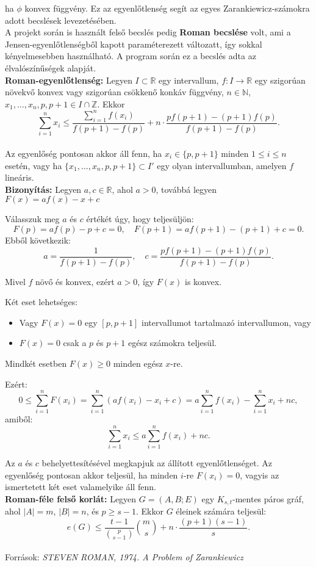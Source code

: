 \documentclass[12pt,a4paper]{article}
\begin{document}
ha $\phi$ konvex függvény. Ez az egyenlőtlenség segít az egyes Zarankiewicz-számokra adott becslések levezetésében.
\\[2mm]
A projekt során is használt felső becslés pedig \textbf{Roman becslése} volt, ami a Jensen-egyenlőtlenségből kapott paraméterezett változatt, így sokkal kényelmesebben használható. A program során ez a becslés adta az élvalószínűségek alapját.
\\[2mm]
\textbf{Roman-egyenlőtlenség:} Legyen $I \subset \mathbb{R}$ egy intervallum, $f : I \to \mathbb{R}$ egy szigorúan növekvő konvex vagy szigorúan csökkenő konkáv függvény, $n \in \mathbb{N}$, $x_1, \dots, x_n, p, p+1 \in I \cap \mathbb{Z}$. Ekkor
\[
\sum_{i=1}^{n} x_i \leq \frac{\sum_{i=1}^{n} f(x_i)}{f(p+1) - f(p)} + n \cdot \frac{p f(p+1) - (p+1) f(p)}{f(p+1) - f(p)}.
\]
\\[2mm]
Az egyenlőség pontosan akkor áll fenn, ha $x_i \in \{p, p+1\}$ minden $1 \leq i \leq n$ esetén, vagy ha $\{x_1, \dots, x_n, p, p+1\} \subset I'$ egy olyan intervallumban, amelyen $f$ lineáris.
\\[2mm]
\textbf{Bizonyítás:} Legyen $a, c \in \mathbb{R}$, ahol $a > 0$, továbbá legyen $F(x) = a f(x) - x + c$

Válasszuk meg $a$ és $c$ értékét úgy, hogy teljesüljön:
\[
F(p) = a f(p) - p + c = 0,\quad F(p+1) = a f(p+1) - (p+1) + c = 0.
\]
Ebből következik:
\[
a = \frac{1}{f(p+1) - f(p)},\quad c = \frac{p f(p+1) - (p+1) f(p)}{f(p+1) - f(p)}.
\]

Mivel $f$ növő és konvex, ezért $a > 0$, így $F(x)$ is konvex.

Két eset lehetséges:
\begin{itemize}
  \item Vagy $F(x) = 0$ egy $[p, p+1]$ intervallumot tartalmazó intervallumon, vagy
  \item $F(x) = 0$ csak a $p$ és $p+1$ egész számokra teljesül.
\end{itemize}
Mindkét esetben $F(x) \geq 0$ minden egész $x$-re.

Ezért:
\[
0 \leq \sum_{i=1}^n F(x_i) = \sum_{i=1}^n (a f(x_i) - x_i + c) = a \sum_{i=1}^n f(x_i) - \sum_{i=1}^n x_i + n c,
\]
amiből:
\[
\sum_{i=1}^n x_i \leq a \sum_{i=1}^n f(x_i) + n c.
\]

Az $a$ és $c$ behelyettesítésével megkapjuk az állított egyenlőtlenséget. Az egyenlőség pontosan akkor teljesül, ha minden $i$-re $F(x_i) = 0$, vagyis az ismertetett két eset valamelyike áll fenn.\\[2mm]
\textbf{Roman-féle felső korlát:} Legyen $G = (A, B; E)$ egy $K_{s,t}$-mentes páros gráf, ahol $|A| = m$, $|B| = n$, és $p \geq s - 1$. Ekkor $G$ éleinek számára teljesül:
\[
e(G) \leq \frac{t - 1}{\binom{p}{s - 1}} \binom{m}{s} + n \cdot \frac{(p + 1)(s - 1)}{s}.
\]
\\[5mm]
\noindent Források: \textit{STEVEN ROMAN, 1974. A Problem of Zarankiewicz} \cite{roman1974zarankiewicz}
\end{document}
